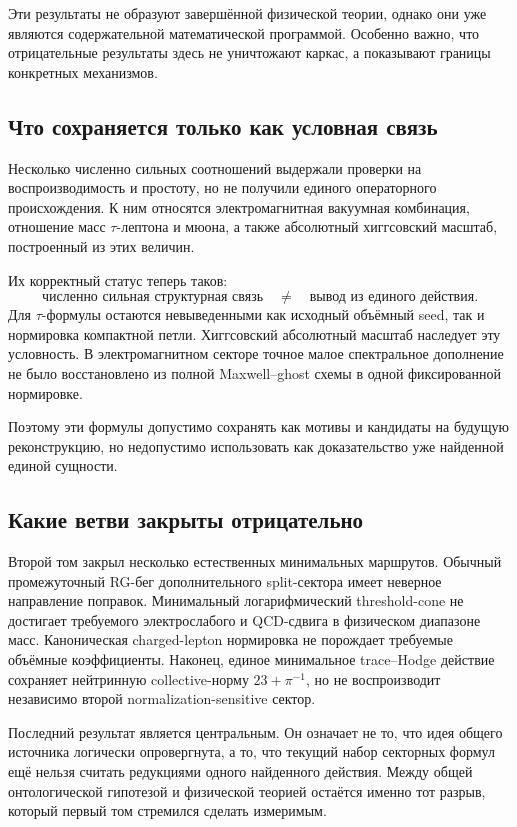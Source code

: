 \documentclass[12pt,a4paper]{article}
\begin{document}
Эти результаты не образуют завершённой физической теории, однако они уже являются содержательной математической программой. Особенно важно, что отрицательные результаты здесь не уничтожают каркас, а показывают границы конкретных механизмов.

\subsection{Что сохраняется только как условная связь}

Несколько численно сильных соотношений выдержали проверки на воспроизводимость и простоту, но не получили единого операторного происхождения. К ним относятся электромагнитная вакуумная комбинация, отношение масс \(\tau\)-лептона и мюона, а также абсолютный хиггсовский масштаб, построенный из этих величин.

Их корректный статус теперь таков:
\begin{equation}
\text{численно сильная структурная связь}
\quad\neq\quad
\text{вывод из единого действия}.
\end{equation}
Для \(\tau\)-формулы остаются невыведенными как исходный объёмный seed, так и нормировка компактной петли. Хиггсовский абсолютный масштаб наследует эту условность. В электромагнитном секторе точное малое спектральное дополнение не было восстановлено из полной Maxwell--ghost схемы в одной фиксированной нормировке.

Поэтому эти формулы допустимо сохранять как мотивы и кандидаты на будущую реконструкцию, но недопустимо использовать как доказательство уже найденной единой сущности.

\subsection{Какие ветви закрыты отрицательно}

Второй том закрыл несколько естественных минимальных маршрутов. Обычный промежуточный RG-бег дополнительного split-сектора имеет неверное направление поправок. Минимальный логарифмический threshold-cone не достигает требуемого электрослабого и QCD-сдвига в физическом диапазоне масс. Каноническая charged-lepton нормировка не порождает требуемые объёмные коэффициенты. Наконец, единое минимальное trace--Hodge действие сохраняет нейтринную collective-норму \(23+\pi^{-1}\), но не воспроизводит независимо второй normalization-sensitive сектор.

Последний результат является центральным. Он означает не то, что идея общего источника логически опровергнута, а то, что текущий набор секторных формул ещё нельзя считать редукциями одного найденного действия. Между общей онтологической гипотезой и физической теорией остаётся именно тот разрыв, который первый том стремился сделать измеримым.
\end{document}
